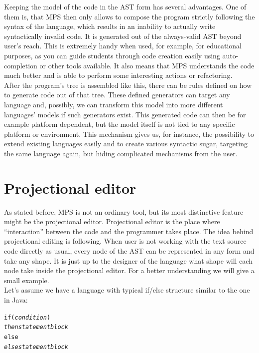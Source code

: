 Keeping the model of the code in the AST form has several advantages.
One of them is, that  MPS then only allows to compose the program strictly following the syntax of the language, which results in an inability to actually write syntactically invalid code.
It is generated out of the always-valid AST beyond user's reach.
This is extremely handy when used, for example, for educational purposes, as you can guide students through code creation easily using auto-completion or other tools available.
It also means that MPS understands the code much better and is able to perform some interesting actions or refactoring.
\\

After the program's tree is assembled like this, there can be rules defined on how to generate code out of that tree.
These defined generators can target any language and, possibly, we can transform this model into more different languages' models if such generators exist.
This generated code can then be for example platform dependent, but the model itself is not tied to any specific platform or environment.
This mechanism gives us, for instance, the possibility to extend existing languages easily and to create various syntactic sugar, targeting the same language again, but hiding complicated mechanisms from the user.

\section{Projectional editor}
As stated before, MPS is not an ordinary tool, but its most distinctive feature might be the projectional editor.
Projectional editor is the place where “interaction” between the code and the programmer takes place.
The idea behind projectional editing is following.
When user is not working with the text source code directly as usual, every node of the AST can be represented in any form and take any shape.
It is just up to the designer of the language what shape will each node take inside the projectional editor.
For a better understanding we will give a small example.
\\

Let's assume we have a language with typical if/else structure similar to the one in Java:

\begin{center}
	\begin{minipage}{.38\textwidth}
		\begin{alltt}
			if (\textit{condition})
			    \textit{then statement block}
			else
			    \textit{else statement block}
		\end{alltt}
	\end{minipage}
\end{center}

